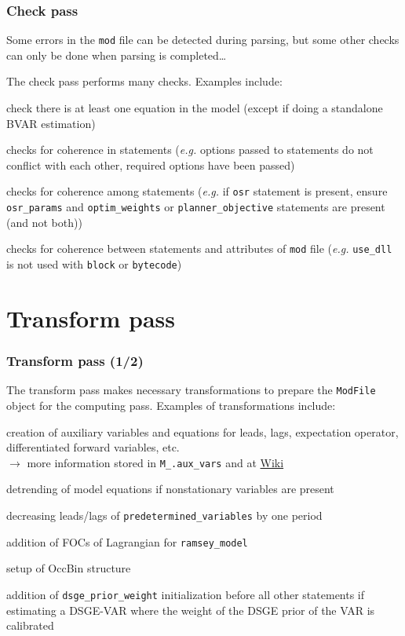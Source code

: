\documentclass[handout,usepdftitle=false,xcolor=dvipsnames,aspectratio=169]{beamer}
\begin{document}
\begin{frame}
  \frametitle{Check pass}
  \begin{witemize}
  \item Some errors in the \texttt{mod} file can be detected during parsing, but some other checks can only be done when parsing is completed\ldots
  \item The check pass performs many checks. Examples include:
    \begin{witemize}
    \item check there is at least one equation in the model (except if doing a standalone BVAR estimation)
    \item checks for coherence in statements (\textit{e.g.} options passed to statements do not conflict with each other, required options have been passed)
    \item checks for coherence among statements (\textit{e.g.} if \texttt{osr} statement is present, ensure \texttt{osr\_params} and \texttt{optim\_weights} or \texttt{planner\_objective} statements are present (and not both))
    \item checks for coherence between statements and attributes of \texttt{mod} file (\textit{e.g.} \texttt{use\_dll} is not used with \texttt{block} or \texttt{bytecode})
    \end{witemize}
  \end{witemize}
\end{frame}

\section{Transform pass}

\begin{frame}
  \frametitle{Transform pass (1/2)}
  \begin{witemize}
  \item The transform pass makes necessary transformations to prepare the \texttt{ModFile} object for the computing pass. Examples of transformations include:
    \begin{witemize}
    \item creation of auxiliary variables and equations for leads, lags, expectation operator, differentiated forward variables, etc.\\
        $\rightarrow$ more information stored in \texttt{M\_.aux\_vars} and at \href{https://git.dynare.org/Dynare/dynare/-/wikis/Auxiliary-variables}{Wiki}
    \item detrending of model equations if nonstationary variables are present
    \item decreasing leads/lags of \texttt{predetermined\_variables} by one period
    \item addition of FOCs of Lagrangian for \texttt{ramsey\_model}
    \item setup of OccBin structure
    \item addition of \texttt{dsge\_prior\_weight} initialization before all other statements if estimating a DSGE-VAR where the weight of the DSGE prior of the VAR is calibrated
    \end{witemize}
  \end{witemize}
\end{frame}
\end{document}
